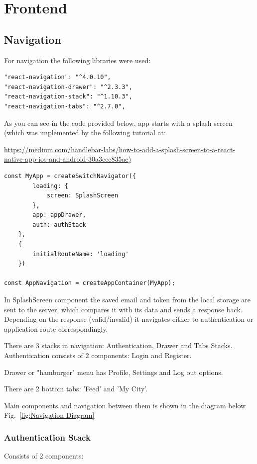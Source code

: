 


\section{Frontend}

\subsection{Navigation}

For navigation the following libraries were used:
\begin{lstlisting}
"react-navigation": "^4.0.10",
"react-navigation-drawer": "^2.3.3",
"react-navigation-stack": "^1.10.3",
"react-navigation-tabs": "^2.7.0",
\end{lstlisting}

As you can see in the code provided below, app starts with a splash screen (which was implemented by the following  tutorial at:  

\url{ https://medium.com/handlebar-labs/how-to-add-a-splash-screen-to-a-react-native-app-ios-and-android-30a3cec835ae)}


\begin{lstlisting}
const MyApp = createSwitchNavigator({
        loading: {
            screen: SplashScreen
        },
        app: appDrawer,
        auth: authStack
    },
    {
        initialRouteName: 'loading'
    })

const AppNavigation = createAppContainer(MyApp);

\end{lstlisting}

In SplashScreen component the saved email and token from the local storage are sent to the server, which compares it with its data and sends a response back. Depending on the response (valid/invalid) it navigates either to authentication or application route correspondingly.

There are 3 stacks in navigation: Authentication, Drawer and Tabs Stacks.
Authentication consists of 2 components: Login and Register.

Drawer or "hamburger" menu has Profile, Settings and Log out options.

There are 2 bottom tabs: 'Feed' and 'My City'.

Main components and navigation between them is shown in the diagram below Fig.~\ref{fig:Navigation Diagram}


\subsubsection{Authentication Stack}
Consists of 2 components:

